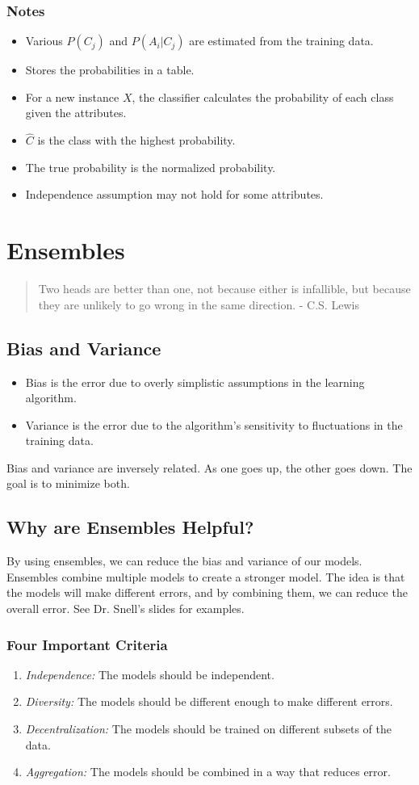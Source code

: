 \documentclass[10pt]{report}
\begin{document}
\subsection{Notes}
\begin{itemize}
  \item Various $P(C_j)$ and $P(A_i | C_j)$ are estimated from the training data.
  \item Stores the probabilities in a table.
  \item For a new instance $X$, the classifier calculates the probability of each class given the attributes.
  \item $\hat{C}$ is the class with the highest probability.
  \item The true probability is the normalized probability.
  \item Independence assumption may not hold for some attributes.
\end{itemize}

\chapter{Ensembles}
\begin{quote}
  Two heads are better than one, not because either is infallible, but because they are unlikely to go wrong in the same direction. - C.S. Lewis
\end{quote}
\section{Bias and Variance}
\begin{itemize}
  \item Bias is the error due to overly simplistic assumptions in the learning algorithm.
  \item Variance is the error due to the algorithm's sensitivity to fluctuations in the training data.
\end{itemize}
Bias and variance are inversely related. As one goes up, the other goes down. The goal is to minimize both.
\section{Why are Ensembles Helpful?}
By using ensembles, we can reduce the bias and variance of our models. Ensembles combine multiple models to create a stronger model. The idea is that the models will make different errors, and by combining them, we can reduce the overall error. See Dr. Snell's slides for examples.
\subsection{Four Important Criteria}
\begin{enumerate}
  \item \textit{Independence:} The models should be independent.
  \item \textit{Diversity:} The models should be different enough to make different errors.
  \item \textit{Decentralization:} The models should be trained on different subsets of the data.
  \item \textit{Aggregation:} The models should be combined in a way that reduces error.
\end{enumerate}
\end{document}
